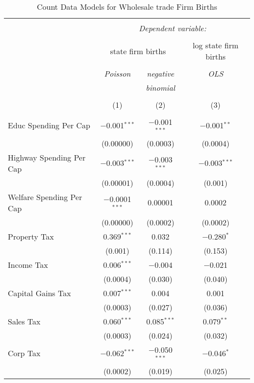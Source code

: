
\begin{table}[!htbp] \centering 
  \caption{Count Data Models for Wholesale trade Firm Births} 
  \label{} 
\begin{tabular}{@{\extracolsep{5pt}}lccc} 
\\[-1.8ex]\hline 
\hline \\[-1.8ex] 
 & \multicolumn{3}{c}{\textit{Dependent variable:}} \\ 
\cline{2-4} 
\\[-1.8ex] & \multicolumn{2}{c}{state firm births} & log state firm births \\ 
\\[-1.8ex] & \textit{Poisson} & \textit{negative} & \textit{OLS} \\ 
 & \textit{} & \textit{binomial} & \textit{} \\ 
\\[-1.8ex] & (1) & (2) & (3)\\ 
\hline \\[-1.8ex] 
 Educ Spending Per Cap & $-$0.001$^{***}$ & $-$0.001$^{***}$ & $-$0.001$^{**}$ \\ 
  & (0.00000) & (0.0003) & (0.0004) \\ 
  Highway Spending Per Cap  & $-$0.003$^{***}$ & $-$0.003$^{***}$ & $-$0.003$^{***}$ \\ 
  & (0.00001) & (0.0004) & (0.001) \\ 
  Welfare Spending Per Cap  & $-$0.0001$^{***}$ & 0.00001 & 0.0002 \\ 
  & (0.00000) & (0.0002) & (0.0002) \\ 
  Property Tax & 0.369$^{***}$ & 0.032 & $-$0.280$^{*}$ \\ 
  & (0.001) & (0.114) & (0.153) \\ 
  Income Tax & 0.006$^{***}$ & $-$0.004 & $-$0.021 \\ 
  & (0.0004) & (0.030) & (0.040) \\ 
  Capital Gains Tax & 0.007$^{***}$ & 0.004 & 0.001 \\ 
  & (0.0003) & (0.027) & (0.036) \\ 
  Sales Tax & 0.060$^{***}$ & 0.085$^{***}$ & 0.079$^{**}$ \\ 
  & (0.0003) & (0.024) & (0.032) \\ 
  Corp Tax & $-$0.062$^{***}$ & $-$0.050$^{***}$ & $-$0.046$^{*}$ \\ 
  & (0.0002) & (0.019) & (0.025) \\ 

\end{tabular}
\end{table}
